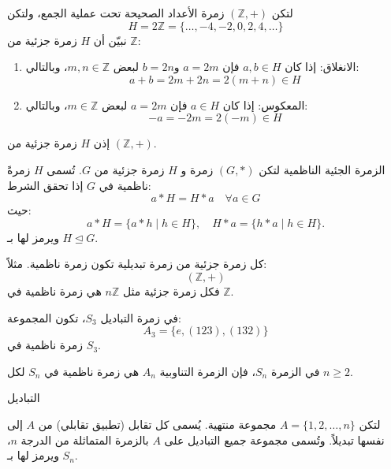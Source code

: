 \begin{example}
	لتكن $(\mathbb{Z}, +)$ زمرة الأعداد الصحيحة تحت عملية الجمع، ولتكن
	\[
	H = 2\mathbb{Z} = \{ \dots, -4, -2, 0, 2, 4, \dots \}
	\]
	نبيّن أن $H$ زمرة جزئية من $\mathbb{Z}$:
	
	\begin{enumerate}
		\item الانغلاق: إذا كان $a, b \in H$ فإن $a = 2m$ و$b = 2n$ لبعض $m, n \in \mathbb{Z}$، وبالتالي:
		\[
		a + b = 2m + 2n = 2(m+n) \in H
		\]
		
		\item المعكوس: إذا كان $a \in H$ فإن $a = 2m$ لبعض $m \in \mathbb{Z}$، وبالتالي:
		\[
		-a = -2m = 2(-m) \in H
		\]
	\end{enumerate}
	إذن $H$ زمرة جزئية من $(\mathbb{Z}, +)$.
\end{example}

\begin{definition}{الزمرة الجئية الناظمية}{\cite{ref3}}
	لتكن $(G, *)$ زمرة و $H$ زمرة جزئية من $G$. تُسمى $H$ زمرةً ناظمية في $G$ إذا تحقق الشرط:
	\[
	a * H = H * a \quad \forall a \in G
	\]
	حيث:
	\[
	a * H = \{a * h \mid h \in H\}, \quad H * a = \{h * a \mid h \in H\}.
	\]
	ويرمز لها بـ $H \trianglelefteq G$.
\end{definition}

\begin{example}
	كل زمرة جزئية من زمرة تبديلية تكون زمرة ناظمية. مثلاً:
	\[
	(\mathbb{Z}, +)
	\]
	فكل زمرة جزئية مثل $n\mathbb{Z}$ هي زمرة ناظمية في $\mathbb{Z}$.
\end{example}

\begin{example}
	في زمرة التباديل $S_3$، تكون المجموعة:
	\[
	A_3 = \{ e, (123), (132) \}
	\]
	زمرة ناظمية في $S_3$.
\end{example}

\begin{example}
	في الزمرة $S_n$، فإن الزمرة التناوبية $A_n$ هي زمرة ناظمية في $S_n$ لكل $n \ge 2$.
\end{example}


\begin{definition}{التباديل}{\cite{ref4}}
	لتكن $A = \{1, 2, \dots, n\}$ مجموعة منتهية. يُسمى كل تقابل (تطبيق تقابلي) من $A$ إلى نفسها تبديلاً. وتُسمى مجموعة جميع التباديل على $A$ بالزمرة المتماثلة من الدرجة $n$، ويرمز لها بـ $S_n$.
\end{definition}

